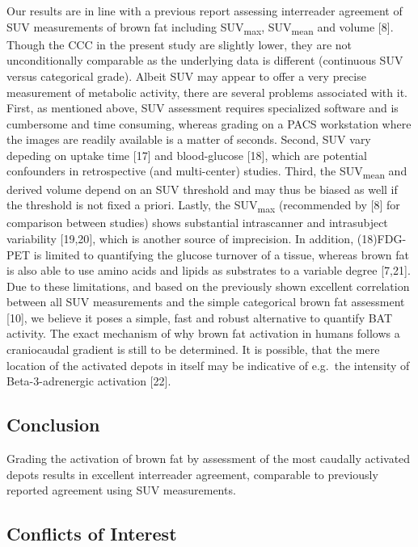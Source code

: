 \documentclass[]{elsarticle} %
\begin{document}
Our results are in line with a previous report assessing interreader
agreement of SUV measurements of brown fat including
SUV\textsubscript{max}, SUV\textsubscript{mean} and volume {[}8{]}.
Though the CCC in the present study are slightly lower, they are not
unconditionally comparable as the underlying data is different
(continuous SUV versus categorical grade). Albeit SUV may appear to
offer a very precise measurement of metabolic activity, there are
several problems associated with it. First, as mentioned above, SUV
assessment requires specialized software and is cumbersome and time
consuming, whereas grading on a PACS workstation where the images are
readily available is a matter of seconds. Second, SUV vary depeding on
uptake time {[}17{]} and blood-glucose {[}18{]}, which are potential
confounders in retrospective (and multi-center) studies. Third, the
SUV\textsubscript{mean} and derived volume depend on an SUV threshold
and may thus be biased as well if the threshold is not fixed a priori.
Lastly, the SUV\textsubscript{max} (recommended by {[}8{]} for
comparison between studies) shows substantial intrascanner and
intrasubject variability {[}19,20{]}, which is another source of
imprecision. In addition, (18)FDG-PET is limited to quantifying the
glucose turnover of a tissue, whereas brown fat is also able to use
amino acids and lipids as substrates to a variable degree {[}7,21{]}.
Due to these limitations, and based on the previously shown excellent
correlation between all SUV measurements and the simple categorical
brown fat assessment {[}10{]}, we believe it poses a simple, fast and
robust alternative to quantify BAT activity. The exact mechanism of why
brown fat activation in humans follows a craniocaudal gradient is still
to be determined. It is possible, that the mere location of the
activated depots in itself may be indicative of e.g.~the intensity of
Beta-3-adrenergic activation {[}22{]}.

\subsection{Conclusion}\label{conclusion}

Grading the activation of brown fat by assessment of the most caudally
activated depots results in excellent interreader agreement, comparable
to previously reported agreement using SUV measurements.

\subsection{Conflicts of Interest}\label{conflicts-of-interest}
\end{document}
